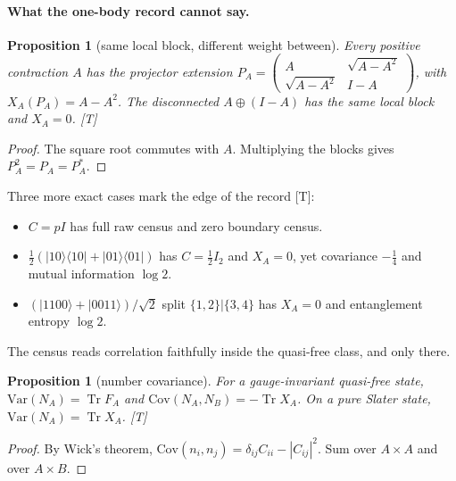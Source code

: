 \documentclass[11pt]{article}
\newtheorem{proposition}[theorem]{Proposition}
\theoremstyle{definition}
\newcommand{\grade}[1]{\textsf{\small[#1]}}
\newcommand{\Tr}{\operatorname{Tr}}
\begin{document}
\paragraph{What the one-body record cannot say.}
\begin{proposition}[same local block, different weight between]\label{prop:extension}
Every positive contraction $A$ has the projector extension $P_A=\begin{pmatrix}A&\sqrt{A-A^2}\\\sqrt{A-A^2}&I-A\end{pmatrix}$, with $X_A(P_A)=A-A^2$. The disconnected $A\oplus(I-A)$ has the same local block and $X_A=0$. \grade{T}
\end{proposition}
\begin{proof}
The square root commutes with $A$. Multiplying the blocks gives $P_A^2=P_A=P_A^*$.
\end{proof}
Three more exact cases mark the edge of the record \grade{T}:
\begin{itemize}
\item $C=pI$ has full raw census and zero boundary census.
\item $\tfrac12(|10\rangle\langle10|+|01\rangle\langle01|)$ has $C=\tfrac12I_2$ and $X_A=0$, yet covariance $-\tfrac14$ and mutual information $\log2$.
\item $(|1100\rangle+|0011\rangle)/\sqrt2$ split $\{1,2\}|\{3,4\}$ has $X_A=0$ and entanglement entropy $\log2$.
\end{itemize}
The census reads correlation faithfully inside the quasi-free class, and only there.

\begin{proposition}[number covariance]\label{prop:var}
For a gauge-invariant quasi-free state, $\mathrm{Var}(N_A)=\Tr F_A$ and $\mathrm{Cov}(N_A,N_B)=-\Tr X_A$. On a pure Slater state, $\mathrm{Var}(N_A)=\Tr X_A$. \grade{T}
\end{proposition}
\begin{proof}
By Wick's theorem, $\mathrm{Cov}(n_i,n_j)=\delta_{ij}C_{ii}-|C_{ij}|^2$. Sum over $A\times A$ and over $A\times B$.
\end{proof}
\end{document}

